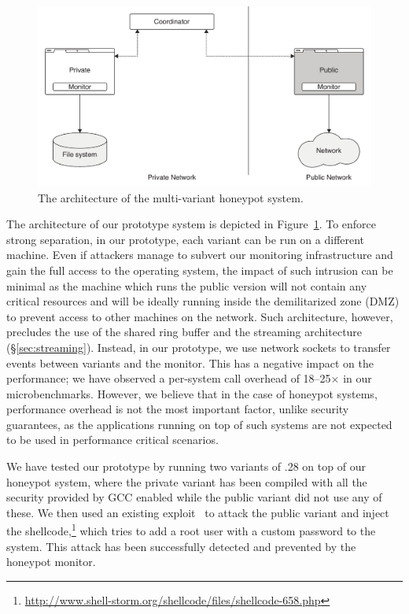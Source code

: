 \begin{figure}[t]
  \begin{center}
    \includegraphics[width=0.75\columnwidth]{applications/figures/honeypot}
    \caption{The architecture of the multi-variant honeypot system.}
    \label{fig:security-honeypot}
  \end{center}
\end{figure}

The architecture of our prototype system is depicted in
Figure~\ref{fig:security-honeypot}.  To enforce strong separation, in our
prototype, each variant can be run on a different machine. Even if attackers
manage to subvert our monitoring infrastructure and gain the full access to the
operating system, the impact of such intrusion can be minimal as the machine
which runs the public version will not contain any critical resources and will
be ideally running inside the demilitarized zone (DMZ) to prevent access to
other machines on the network.  Such architecture, however, precludes the use
of the shared ring buffer and the streaming architecture
(\S\ref{sec:streaming}). Instead, in our prototype, we use network sockets to
transfer events between variants and the monitor. This has a negative impact on
the performance; we have observed a per-system call overhead of
\numrange{18}{25}$\times$ in our microbenchmarks. However, we believe that in
the case of honeypot systems, performance overhead is not the most important
factor, unlike security guarantees, as the applications running on top of such
systems are not expected to be used in performance critical scenarios.

We have tested our prototype by running two variants of .28 on top
of our honeypot system, where the private variant has been compiled with all
the security provided by GCC enabled while the public variant did not use any
of these.
We then used an existing exploit~\cite{erickson:hacking-networking} to attack the public variant and
inject the shellcode,\footnote{\url{http://www.shell-storm.org/shellcode/files/shellcode-658.php}}
which tries to add a root user with a custom password to the system. This
attack has been successfully detected and prevented by the honeypot monitor.
